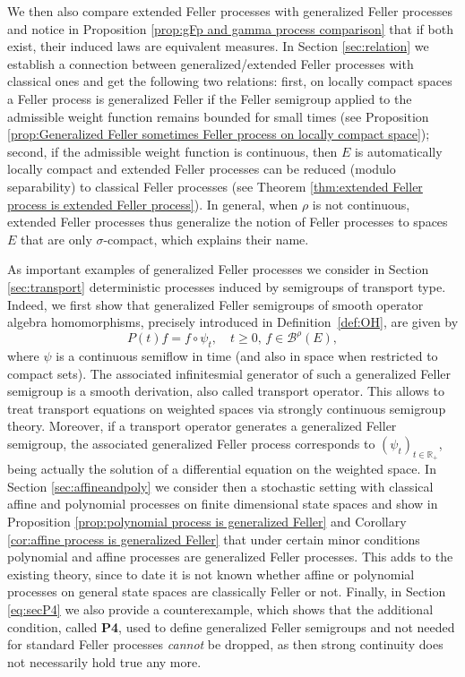 \documentclass[a4paper,12pt]{article}
\theoremstyle{definition}
\theoremstyle{remark}
\numberwithin{equation}{section}
\numberwithin{theorem}{section}
\begin{document}
We then also compare extended Feller processes with generalized Feller processes and notice in Proposition \ref{prop:gFp and gamma process comparison} that if both exist, their induced laws are equivalent measures.
In Section \ref{sec:relation} we establish a connection between generalized/extended Feller processes with 
classical ones and get the following two relations: first, on locally compact spaces  a Feller process is  generalized Feller if the Feller semigroup applied to the admissible weight function remains bounded for small times (see Proposition \ref{prop:Generalized Feller sometimes Feller process on locally compact space}); second, if  the admissible weight function is continuous, then $E$ is automatically locally compact and extended Feller processes can be reduced (modulo separability) to classical Feller processes (see Theorem \ref{thm:extended Feller process is extended Feller process}). In general, when $\rho$ is not continuous, extended Feller processes thus
generalize the notion of Feller processes to spaces $E$ that are only $\sigma$-compact, which explains their name.

As important examples of generalized Feller processes we consider in Section \ref{sec:transport} deterministic processes induced by semigroups of transport type. Indeed, we first show that generalized Feller semigroups of smooth operator algebra homomorphisms, precisely introduced in Definition~\ref{def:OH}, are given by 
\[
P(t)f=f \circ  \psi_t, \quad t \geq 0, \, f \in \mathscr{B}^\rho(E),
\]
where $\psi$ is a continuous semiflow in time (and also in space when restricted to compact sets).
The associated infinitesmial generator of such a generalized Feller semigroup is a smooth derivation, also called transport operator.
 This allows to treat transport equations on weighted spaces via strongly continuous semigroup theory. Moreover, if a transport operator generates a generalized Feller semigroup, the associated generalized Feller process corresponds to $(\psi_t)_{t \in \mathbb{R}_+}$, being actually the solution of a differential equation on the weighted space. In Section \ref{sec:affineandpoly} we consider then a stochastic setting with classical affine and polynomial processes on finite dimensional state spaces and show in Proposition \ref{prop:polynomial process is generalized Feller} and Corollary \ref{cor:affine process is generalized Feller} that under certain minor conditions polynomial and affine processes are generalized Feller processes. This adds
to the existing theory, since to date it is not known whether affine or polynomial processes on general state spaces are classically Feller or not. Finally, in Section \ref{eq:secP4} we also provide a counterexample, which shows that 
the additional 
 condition, called \textbf{P4}, used to define generalized Feller semigroups  and not needed for standard Feller processes \emph{cannot} be dropped, as then strong continuity does not necessarily hold true any more.
\end{document}
